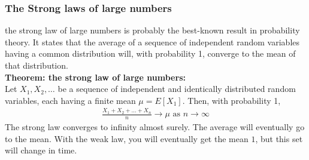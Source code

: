 \documentclass[a4paper]{article}
\begin{document}
\subsubsection{The Strong laws of large numbers}
the strong law of large numbers is probably the best-known result in probability theory. It states that the average of a sequence of independent random variables having a common distribution will, with probability 1, converge to the mean of that distribution.\\
{\bf Theorem: the strong law of large numbers:} \\
Let $X_1,X_2,\dots$ be a sequence of independent and identically distributed random variables, each having a finite mean $\mu=E[X_1]$. Then, with probability 1,
\begin{align}
  \frac{X_1+X_2+\dots+X_n}{n}\rightarrow\mu \text{ as }n\rightarrow\infty
\end{align}
The strong law converges to infinity almost surely. The average will eventually go to the mean. With the weak law, you will eventually get the mean $1$, but this set will change in time. 
\end{document}
